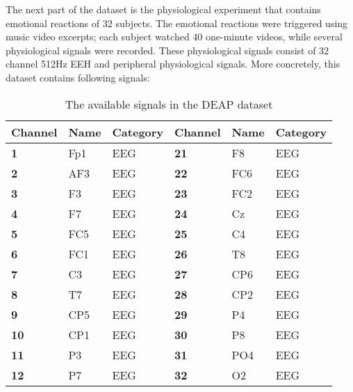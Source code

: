\npar

The next part of the dataset is the physiological experiment that contains emotional reactions of 32 subjects. The emotional reactions were triggered using music video excerpts; each subject watched 40 one-minute videos, while several physiological signals were recorded. These physiological signals consist of 32 channel 512Hz EEH and peripheral physiological signals. More concretely, this dataset contains following signals:
\begin{table}[]
\centering
\caption{The available signals in the DEAP dataset}
\label{DEAPSignals}
\begin{tabular}{l|ll|l|ll}
\textbf{Channel} & \textbf{Name} & \textbf{Category} & \textbf{Channel} & \textbf{Name}    & \textbf{Category} \\ \hline
\textbf{1}       & Fp1           & EEG               & \textbf{21}      & F8               & EEG               \\
\textbf{2}       & AF3           & EEG               & \textbf{22}      & FC6              & EEG               \\
\textbf{3}       & F3            & EEG               & \textbf{23}      & FC2              & EEG               \\
\textbf{4}       & F7            & EEG               & \textbf{24}      & Cz               & EEG               \\
\textbf{5}       & FC5           & EEG               & \textbf{25}      & C4               & EEG               \\
\textbf{6}       & FC1           & EEG               & \textbf{26}      & T8               & EEG               \\
\textbf{7}       & C3            & EEG               & \textbf{27}      & CP6              & EEG               \\
\textbf{8}       & T7            & EEG               & \textbf{28}      & CP2              & EEG               \\
\textbf{9}       & CP5           & EEG               & \textbf{29}      & P4               & EEG               \\
\textbf{10}      & CP1           & EEG               & \textbf{30}      & P8               & EEG               \\
\textbf{11}      & P3            & EEG               & \textbf{31}      & PO4              & EEG               \\
\textbf{12}      & P7            & EEG               & \textbf{32}      & O2               & EEG               \\

\end{tabular}
\end{table}
